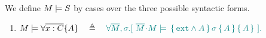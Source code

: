 \begin{definition}%

We define $M \models {S}$ by cases over the three possible syntactic forms.

\label{def:necessity-semantics}

\begin{enumerate}
 \item
 $M \models \forall {\overline {x:C}}{{\{}}{A}{{\}}} \ \  \ \triangleq   \ \ \ {\color{teal}{\forall   \overline{M},  \sigma. [ \  {\ensuremath{\overline{M}\!\cdot\! M \models \, \{\, \mbox{\normalfont{\texttt{ext}}} \wedge A\,\}\, \sigma \, \{\, A\,\} \, \{\, A\,\} } }\ ].}}$

\end{enumerate}
\end{definition}

